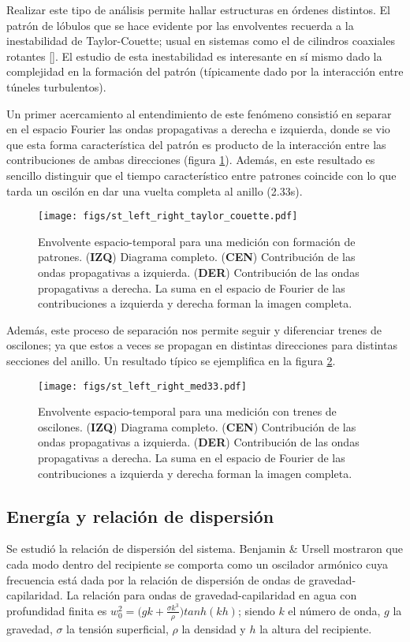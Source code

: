 \documentclass[../main.tex]{subfiles}
\begin{document}
Realizar este tipo de análisis permite hallar estructuras en órdenes distintos. El patrón de lóbulos que se hace evidente por las envolventes recuerda a la inestabilidad de Taylor-Couette; usual en sistemas como el de cilindros coaxiales rotantes [\cite{taylor_couette}]. El estudio de esta inestabilidad es interesante en sí mismo dado la complejidad en la formación del patrón (típicamente dado por la interacción entre túneles turbulentos). 

Un primer acercamiento al entendimiento de este fenómeno consistió en separar en el espacio Fourier las ondas propagativas a derecha e izquierda, donde se vio que esta forma característica del patrón es producto de la interacción entre las contribuciones de ambas direcciones (figura \ref{fig:ondas_propagativas_tc}). Además, en este resultado es sencillo distinguir que el tiempo característico entre patrones coincide con lo que tarda un oscilón en dar una vuelta completa al anillo (2.33\si{s}).

\begin{figure}[H]
	\centering
	\texttt{[image: figs/st\_left\_right\_taylor\_couette.pdf]}
    \caption{Envolvente espacio-temporal para una medición con formación de patrones. (\textbf{IZQ}) Diagrama completo. (\textbf{CEN}) Contribución de las ondas propagativas a izquierda. (\textbf{DER}) Contribución de las ondas propagativas a derecha. La suma en el espacio de Fourier de las contribuciones a izquierda y derecha forman la imagen completa.}
    \label{fig:ondas_propagativas_tc}
\end{figure}

Además, este proceso de separación nos permite seguir y diferenciar trenes de oscilones; ya que estos a veces se propagan en distintas direcciones para distintas secciones del anillo. Un resultado típico se ejemplifica en la figura \ref{fig:ondas_propagativas}.

\begin{figure}[H]
	\centering
	\texttt{[image: figs/st\_left\_right\_med33.pdf]}
    \caption{Envolvente espacio-temporal para una medición con trenes de oscilones. (\textbf{IZQ}) Diagrama completo. (\textbf{CEN}) Contribución de las ondas propagativas a izquierda. (\textbf{DER}) Contribución de las ondas propagativas a derecha. La suma en el espacio de Fourier de las contribuciones a izquierda y derecha forman la imagen completa.}
    \label{fig:ondas_propagativas}
\end{figure}

\subsection{Energía y relación de dispersión}
Se estudió la relación de dispersión del sistema. Benjamin \& Ursell mostraron que cada modo dentro del recipiente
se comporta como un oscilador armónico cuya frecuencia está dada por la relación de dispersión de ondas de gravedad-capilaridad. La relación para ondas de gravedad-capilaridad en agua con profundidad finita es $w_0^2 = \big( gk + \frac{\sigma k^3}{\rho} \big) tanh(kh)$; siendo $k$ el número de onda, $g$ la gravedad, $\sigma$ la tensión superficial, $\rho$ la densidad y $h$ la altura del recipiente. 
\end{document}
